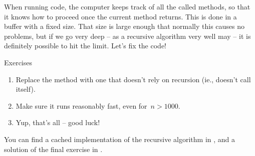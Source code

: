 When running code, the computer keeps track of all the called methods, so that it knows how to proceed once the current method returns. This is done in a buffer with a fixed size. That size is large enough that normally this causes no problems, but if we go very deep -- as a recursive algorithm very well may -- it is definitely possible to hit the limit. Let's fix the code!
%
\begin{mybox}{Exercises}
    \begin{enumerate}
        \item Replace the method  with one that doesn't rely on recursion (ie., doesn't call itself).
        \item Make sure it runs reasonably fast, even for~$n > 1000$.
        \item Yup, that's all -- good luck!
    \end{enumerate}
\end{mybox}
%
You can find a cached implementation of the recursive algorithm in , and a solution of the final exercise in .

